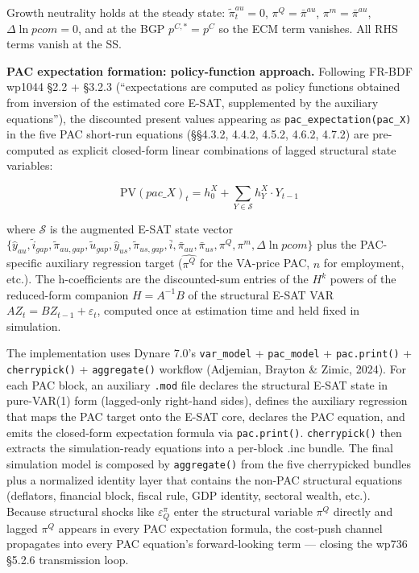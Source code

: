 \documentclass[
]{article}
\begin{document}
Growth neutrality holds at the steady state: \(\tilde{\pi}^{au}_t = 0\),
\(\pi^Q = \bar{\pi}^{au}\), \(\pi^m = \bar{\pi}^{au}\),
\(\Delta\ln pcom = 0\), and at the BGP \(p^{C,\ast} = p^C\) so the ECM
term vanishes. All RHS terms vanish at the SS.

\textbf{PAC expectation formation: policy-function approach.} Following
FR-BDF wp1044 §2.2 + §3.2.3 (``expectations are computed as policy
functions obtained from inversion of the estimated core E-SAT,
supplemented by the auxiliary equations''), the discounted present
values appearing as \texttt{pac\_expectation(pac\_X)} in the five PAC
short-run equations (§§4.3.2, 4.4.2, 4.5.2, 4.6.2, 4.7.2) are
pre-computed as explicit closed-form linear combinations of lagged
structural state variables:

\[\text{PV}(pac\_X)_t = h^X_0 + \sum_{Y \in \mathcal{S}} h^X_Y \cdot Y_{t-1}\]

where \(\mathcal{S}\) is the augmented E-SAT state vector
\(\{\hat{y}_{au}, \tilde{i}_{gap}, \tilde{\pi}_{au,gap}, \tilde{u}_{gap}, \hat{y}_{us}, \tilde{\pi}_{us,gap}, \bar{i}, \bar{\pi}_{au}, \bar{\pi}_{us}, \pi^Q, \pi^m, \Delta \ln pcom\}\)
plus the PAC-specific auxiliary regression target (\(\widehat{\pi^Q}\)
for the VA-price PAC, \(\widehat{n}\) for employment, etc.). The
h-coefficients are the discounted-sum entries of the \(H^k\) powers of
the reduced-form companion \(H = A^{-1}B\) of the structural E-SAT VAR
\(A Z_t = B Z_{t-1} + \varepsilon_t\), computed once at estimation time
and held fixed in simulation.

The implementation uses Dynare 7.0's \texttt{var\_model} +
\texttt{pac\_model} + \texttt{pac.print()} + \texttt{cherrypick()} +
\texttt{aggregate()} workflow (Adjemian, Brayton \& Zimic, 2024). For
each PAC block, an auxiliary \texttt{.mod} file declares the structural
E-SAT state in pure-VAR(1) form (lagged-only right-hand sides), defines
the auxiliary regression that maps the PAC target onto the E-SAT core,
declares the PAC equation, and emits the closed-form expectation formula
via \texttt{pac.print()}. \texttt{cherrypick()} then extracts the
simulation-ready equations into a per-block .inc bundle. The final
simulation model is composed by \texttt{aggregate()} from the five
cherrypicked bundles plus a normalized identity layer that contains the
non-PAC structural equations (deflators, financial block, fiscal rule,
GDP identity, sectoral wealth, etc.). Because structural shocks like
\(\varepsilon^\pi_Q\) enter the structural variable \(\pi^Q\) directly
and lagged \(\pi^Q\) appears in every PAC expectation formula, the
cost-push channel propagates into every PAC equation's forward-looking
term --- closing the wp736 §5.2.6 transmission loop.
\end{document}

